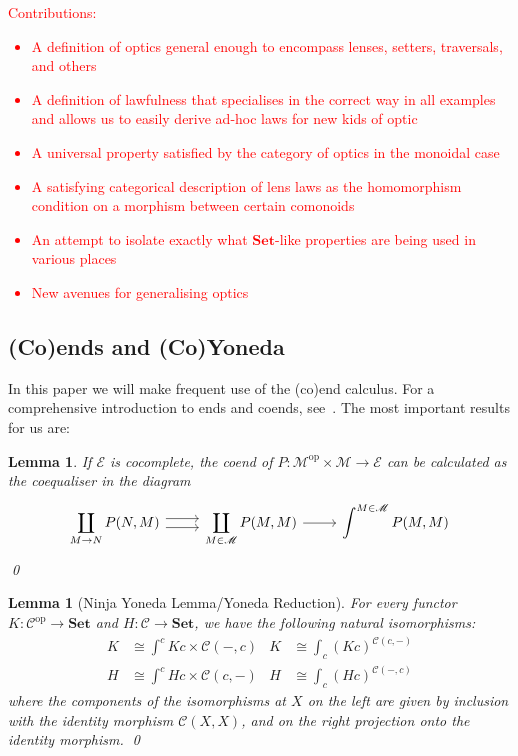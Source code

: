 \documentclass[11pt,a4paper]{article}
\theoremstyle{plain}
\newtheorem{lemma}[theorem]{Lemma}
\theoremstyle{definition}
\newcommand{\C}{\mathscr{C}}
\newcommand{\E}{\mathscr{E}}
\newcommand{\M}{\mathscr{M}}
\newcommand{\Set}{\mathbf{Set}}
\newcommand{\op}{\mathrm{op}}
\newcommand{\todo}[1]{\textcolor{red}{\small #1}}
\begin{document}
\todo{Contributions:
  \begin{itemize}
  \item A definition of optics general enough to encompass lenses, setters, traversals, and others
  \item A definition of lawfulness that specialises in the correct way in all examples and allows us to easily derive ad-hoc laws for new kids of optic
  \item A universal property satisfied by the category of optics in the monoidal case
  \item A satisfying categorical description of lens laws as the homomorphism condition on a morphism between certain comonoids
  \item An attempt to isolate exactly what $\Set$-like properties are being used in various places
  \item New avenues for generalising optics
  \end{itemize}
}

\subsection{(Co)ends and (Co)Yoneda}

In this paper we will make frequent use of the (co)end calculus. For a comprehensive introduction to ends and coends, see~\cite{CoendCofriend}. The most important results for us are:

\begin{lemma}\label{lemma:calculate-coend}
If $\E$ is cocomplete, the coend of $P : \M^\op \times \M \to \E$ can be calculated as the coequaliser in the diagram
\[
  \begin{tikzcd}
    \displaystyle \coprod_{M \to N} P(N, M) \ar[r,shift left=.75ex]  \ar[r,shift right=.75ex] & \displaystyle\coprod_{M \in \M} P(M, M) \ar[r] & \displaystyle\int^{M \in \M} P(M, M)
  \end{tikzcd}
\]
\qed
\end{lemma}

\begin{lemma}[Ninja Yoneda Lemma/Yoneda Reduction]
For every functor $K : \C^\op \to \Set$ and $H : \C \to \Set$, we have the following natural isomorphisms:
\begin{align*}
K &\cong \int^c Kc \times \C(-,c) &
K &\cong \int_c (Kc)^{\C(c,-)} \\
H &\cong \int^c Hc \times \C(c,-)  &
H &\cong \int_c (Hc)^{\C(-,c)}
\end{align*}
where the components of the isomorphisms at $X$ on the left are given by inclusion with the identity morphism $\C(X, X)$, and on the right projection onto the identity morphism.
\qed
\end{lemma}
\end{document}
